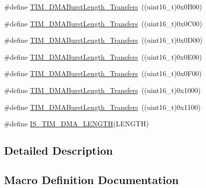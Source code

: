 \begin{DoxyCompactItemize}
\item 
\#define \hyperlink{group___t_i_m___d_m_a___burst___length_ga9160d52913bbd7ad1e663ff943d01852}{T\+I\+M\+\_\+\+D\+M\+A\+Burst\+Length\+\_\+Transfers}~((uint16\+\_\+t)0x0\+B00)
\item 
\#define \hyperlink{group___t_i_m___d_m_a___burst___length_ga11485e9eee8a6a7edc1df868755eab85}{T\+I\+M\+\_\+\+D\+M\+A\+Burst\+Length\+\_\+Transfers}~((uint16\+\_\+t)0x0\+C00)
\item 
\#define \hyperlink{group___t_i_m___d_m_a___burst___length_gab1a097ca7404e518839df99795443fb0}{T\+I\+M\+\_\+\+D\+M\+A\+Burst\+Length\+\_\+Transfers}~((uint16\+\_\+t)0x0\+D00)
\item 
\#define \hyperlink{group___t_i_m___d_m_a___burst___length_gad13373f5fd246557a4fc487dc43c37ec}{T\+I\+M\+\_\+\+D\+M\+A\+Burst\+Length\+\_\+Transfers}~((uint16\+\_\+t)0x0\+E00)
\item 
\#define \hyperlink{group___t_i_m___d_m_a___burst___length_gafb644e6033f7b46c602b02754b69fde0}{T\+I\+M\+\_\+\+D\+M\+A\+Burst\+Length\+\_\+Transfers}~((uint16\+\_\+t)0x0\+F00)
\item 
\#define \hyperlink{group___t_i_m___d_m_a___burst___length_ga5b2c97f650a3c1726965187d852b8cc5}{T\+I\+M\+\_\+\+D\+M\+A\+Burst\+Length\+\_\+Transfers}~((uint16\+\_\+t)0x1000)
\item 
\#define \hyperlink{group___t_i_m___d_m_a___burst___length_gaed9f2afef174079f6eb6927abd995b9b}{T\+I\+M\+\_\+\+D\+M\+A\+Burst\+Length\+\_\+Transfers}~((uint16\+\_\+t)0x1100)
\item 
\#define \hyperlink{group___t_i_m___d_m_a___burst___length_gafd09cf0887b01a15101ba7dd6e2b4ba7}{I\+S\+\_\+\+T\+I\+M\+\_\+\+D\+M\+A\+\_\+\+L\+E\+N\+G\+TH}(L\+E\+N\+G\+TH)
\end{DoxyCompactItemize}


\subsection{Detailed Description}


\subsection{Macro Definition Documentation}
\mbox{\label{group___t_i_m___d_m_a___burst___length_gafd09cf0887b01a15101ba7dd6e2b4ba7}} 
